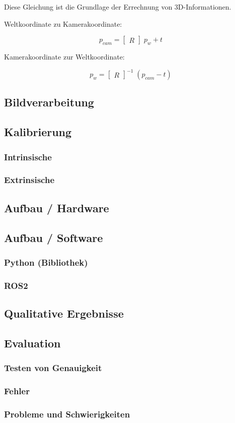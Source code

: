 		Diese Gleichung ist die Grundlage der Errechnung von 3D-Informationen.
		
		Weltkoordinate zu Kamerakoordinate:
		
		\begin{equation}
			p_{cam} = \begin{bmatrix} R \end{bmatrix} \; p_w + t
			\label{eq:welt_zu_kamera}
		\end{equation}
		
		Kamerakoordinate zur Weltkoordinate:
		
		\begin{equation}
			p_w = \begin{bmatrix} R \end{bmatrix}^{-1} \; (p_{cam} - t)
			\label{eq:kamera_zu_welt}
		\end{equation}
		
	\subsection{Bildverarbeitung}
	
	\subsection{Kalibrierung}
		\subsubsection{Intrinsische}
		\subsubsection{Extrinsische}
		
	\subsection{Aufbau / Hardware}
	
	\subsection{Aufbau / Software}
		\subsubsection{Python (Bibliothek)}
		\subsubsection{ROS2}
		
	\subsection{Qualitative Ergebnisse}
	
	\subsection{Evaluation}
		\subsubsection{Testen von Genauigkeit}
		\subsubsection{Fehler}
		\subsubsection{Probleme und Schwierigkeiten}